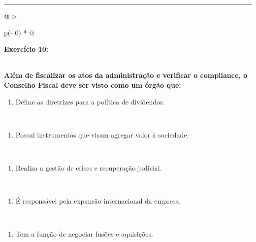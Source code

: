 \documentclass[
]{book}
\providecommand{\tightlist}{%
  \setlength{\itemsep}{0pt}\setlength{\parskip}{0pt}}
\begin{document}
\begin{center}\rule{0.5\linewidth}{0.5pt}\end{center}

\begin{longtable}[]{@{}
  >{\raggedright\arraybackslash}p{(\columnwidth - 0\tabcolsep) * }@{}}
\toprule\noalign{}
\begin{minipage}[b]{\linewidth}\raggedright
\textbf{Exercício 10:}
\end{minipage} \\
\midrule\noalign{}
\endhead
\bottomrule\noalign{}
\endlastfoot
\textbf{Além de fiscalizar os atos da administração e verificar o compliance, o Conselho Fiscal deve ser visto como um órgão que:} \\
\begin{minipage}[t]{\linewidth}\raggedright
\begin{enumerate}
\def\labelenumi{\alph{enumi})}
\tightlist
\item
  Define as diretrizes para a política de dividendos.
\end{enumerate}
\end{minipage} \\
\begin{minipage}[t]{\linewidth}\raggedright
\begin{enumerate}
\def\labelenumi{\alph{enumi})}
\setcounter{enumi}{1}
\tightlist
\item
  Possui instrumentos que visam agregar valor à sociedade.
\end{enumerate}
\end{minipage} \\
\begin{minipage}[t]{\linewidth}\raggedright
\begin{enumerate}
\def\labelenumi{\alph{enumi})}
\setcounter{enumi}{2}
\tightlist
\item
  Realiza a gestão de crises e recuperação judicial.
\end{enumerate}
\end{minipage} \\
\begin{minipage}[t]{\linewidth}\raggedright
\begin{enumerate}
\def\labelenumi{\alph{enumi})}
\setcounter{enumi}{3}
\tightlist
\item
  É responsável pela expansão internacional da empresa.
\end{enumerate}
\end{minipage} \\
\begin{minipage}[t]{\linewidth}\raggedright
\begin{enumerate}
\def\labelenumi{\alph{enumi})}
\setcounter{enumi}{4}
\tightlist
\item
  Tem a função de negociar fusões e aquisições.
\end{enumerate}
\end{minipage} \\
\end{longtable}
\end{document}

